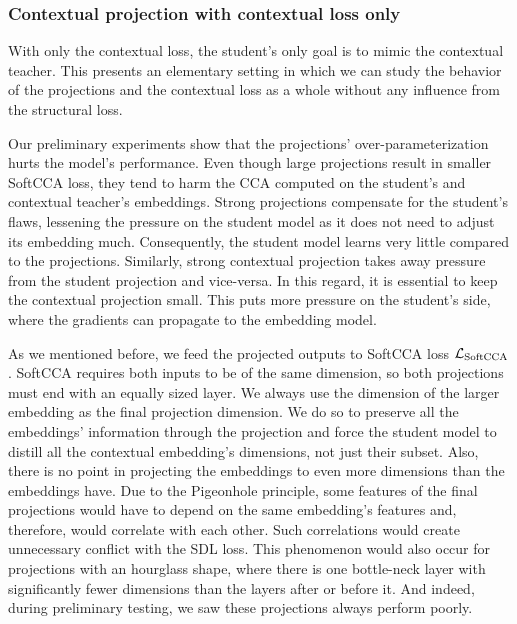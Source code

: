 \subsubsection{Contextual projection with contextual loss
only}\label{section:projections_only_contextual}

With only the contextual loss, the student's only goal is to mimic the
contextual teacher. This presents an elementary setting in which we can study
the behavior of the projections and the contextual loss as a whole without
any influence from the structural loss.

Our preliminary experiments show that the projections' over-parameterization
hurts the model's performance. Even though large projections result in smaller
SoftCCA loss, they tend to harm the CCA computed on the student's and
contextual teacher's embeddings. Strong projections compensate for the
student's flaws, lessening the pressure on the student model as it does not
need to adjust its embedding much. Consequently, the student model learns very
little compared to the projections. Similarly, strong contextual projection
takes away pressure from the student projection and vice-versa. In this regard,
it is essential to keep the contextual projection small. This puts more
pressure on the student's side, where the gradients can propagate to the
embedding model.

As we mentioned before, we feed the projected outputs to SoftCCA loss
$\mathcal{L}_{\text{SoftCCA}}$. SoftCCA requires both inputs to be of the same
dimension, so both projections must end with an equally sized layer. We always use
the dimension of the larger embedding as the final projection dimension. We do
so to preserve all the embeddings' information through the projection and force
the student model to distill all the contextual embedding's dimensions, not just
their subset. Also, there is no point in projecting the embeddings to even more
dimensions than the embeddings have. Due to the Pigeonhole principle, some
features of the final projections would have to depend on the same embedding's
features and, therefore, would correlate with each other. Such correlations
would create unnecessary conflict with the SDL loss. This phenomenon would also
occur for projections with an hourglass shape, where there is one bottle-neck
layer with significantly fewer dimensions than the layers after or before it.
And indeed, during preliminary testing, we saw these projections always perform
poorly.

